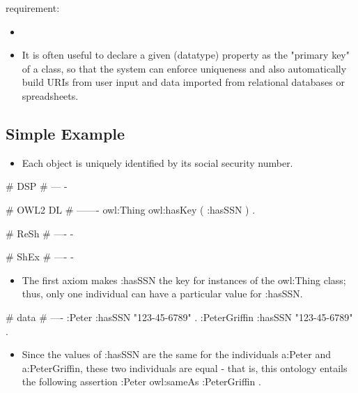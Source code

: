 \documentclass{llncs}
\begin{document}
requirement:

\begin{itemize}
	\item 
\end{itemize}



\begin{itemize}
  \item It is often useful to declare a given (datatype) property as the "primary key" of a class, so that the system can enforce uniqueness and also automatically build URIs from user input and data imported from relational databases or spreadsheets. 
\end{itemize}

\subsection{Simple Example}

\begin{itemize}
	\item Each object is uniquely identified by its social security number.
\end{itemize}

\begin{ex}
# DSP
# ---
-
\end{ex}

\begin{ex}
# OWL2 DL
# -------
owl:Thing owl:hasKey ( :hasSSN ) . 	
\end{ex}

\begin{ex}
# ReSh
# ----
-
\end{ex}

\begin{ex}
# ShEx
# ----
-
\end{ex}

\begin{itemize}
	\item The first axiom makes :hasSSN the key for instances of the owl:Thing class; thus, only one individual can have a particular value for :hasSSN. 
\end{itemize}

\begin{ex}
# data
# ----
:Peter :hasSSN "123-45-6789" . 
:PeterGriffin :hasSSN "123-45-6789" . 
\end{ex}

\begin{itemize}
	\item Since the values of :hasSSN are the same for the individuals a:Peter and a:PeterGriffin, these two individuals are equal - that is, this ontology entails the following assertion :Peter owl:sameAs :PeterGriffin . 
\end{itemize}
\end{document}
